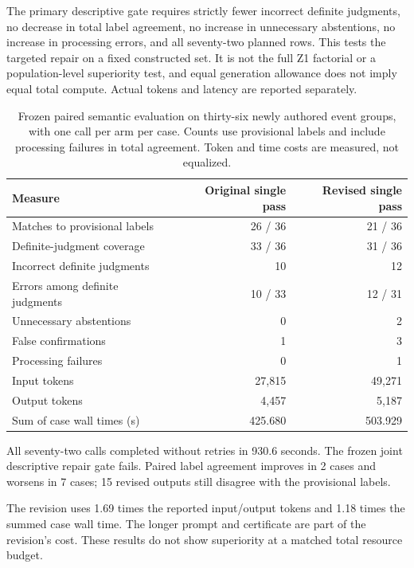 The primary descriptive gate requires strictly fewer incorrect definite judgments, no decrease in total label agreement, no increase in unnecessary abstentions, no increase in processing errors, and all seventy-two planned rows. This tests the targeted repair on a fixed constructed set. It is not the full Z1 factorial or a population-level superiority test, and equal generation allowance does not imply equal total compute. Actual tokens and latency are reported separately.

\begin{table}[htbp]
\centering
\begin{tabular}{@{}lrr@{}}
\toprule
Measure & Original single pass & Revised single pass\\\midrule
Matches to provisional labels & 26 / 36 & 21 / 36\\
Definite-judgment coverage & 33 / 36 & 31 / 36\\
Incorrect definite judgments & 10 & 12\\
Errors among definite judgments & 10 / 33 & 12 / 31\\
Unnecessary abstentions & 0 & 2\\
False confirmations & 1 & 3\\
Processing failures & 0 & 1\\
Input tokens & 27,815 & 49,271\\
Output tokens & 4,457 & 5,187\\
Sum of case wall times (s) & 425.680 & 503.929\\
\bottomrule
\end{tabular}
\caption{Frozen paired semantic evaluation on thirty-six newly authored event groups, with one call per arm per case. Counts use provisional labels and include processing failures in total agreement. Token and time costs are measured, not equalized.}
\label{tab:revised-semantic}
\end{table}

All seventy-two calls completed without retries in 930.6 seconds. The frozen joint descriptive repair gate fails. Paired label agreement improves in 2 cases and worsens in 7 cases; 15 revised outputs still disagree with the provisional labels.

The revision uses 1.69 times the reported input/output tokens and 1.18 times the summed case wall time. The longer prompt and certificate are part of the revision's cost. These results do not show superiority at a matched total resource budget.

